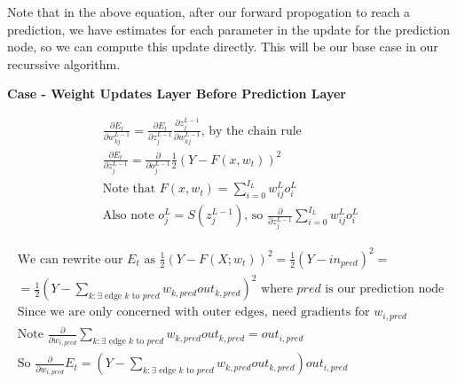 \documentclass[11pt]{article}
\begin{document}
\vspace{5 mm}
\noindent
Note that in the above equation, after our forward propogation to reach a 
prediction, we have estimates for each parameter in the update for the 
prediction node, so we can compute this update directly. This will be our 
base case in our recurssive algorithm.

\vspace{5 mm}
\noindent
\textbf{Case - Weight Updates Layer Before Prediction Layer}

\begin{gather*}
\frac{\partial E_{t}}{\partial w_{kj}^{L - 1}} = 
\frac{\partial E_{t}}{\partial z_{j}^{L - 1}} 
\frac{\partial z_{j}^{L - 1}}{\partial w_{kj}^{L - 1}}
\text{, by the chain rule}\\
\frac{\partial E_{t}}{\partial z_{j}^{L - 1}} = 
\frac{\partial}{\partial o_{j}^{L - 1}} \frac{1}{2}(Y - F(x, w_{t}))^{2}\\
\text{Note that } F(x, w_{t}) = \sum_{i = 0}^{I_{L}} w_{ij}^{L} o_{i}^{L}\\
\text{Also note } o_{j}^{L} = S(z_{j}^{L - 1}) 
\text{, so } 
\frac{\partial}{\partial z_{j}^{L - 1}} 
\sum_{i = 0}^{I_{L}} w_{ij}^{L} o_{i}^{L} 
\end{gather*}



\begin{gather*}
\text{We can rewrite our } E_{t} \text{ as } 
\frac{1}{2}(Y - F(X; w_{t}))^{2} = 
\frac{1}{2}(Y - in_{pred})^{2} = \\
= \frac{1}{2}(Y - 
\sum_{k: \exists \text{ edge } k \text{ to } pred} w_{k,pred} out_{k,pred})^{2}
\text{ where } pred \text{ is our prediction node}\\
\text{Since we are only concerned with outer edges, need gradients for } 
w_{i, pred}\\
\text{Note } \frac{\partial}{\partial w_{i,pred}}
\sum_{k: \exists \text{ edge } k \text{ to } pred} w_{k,pred} out_{k,pred} = 
out_{i, pred}\\
\text{So } \frac{\partial}{\partial w_{i,pred}} E_{t} = 
(Y - \sum_{k: \exists \text{ edge } k \text{ to } pred} w_{k,pred} out_{k,pred})
out_{i, pred}
\end{gather*}
\end{document}
